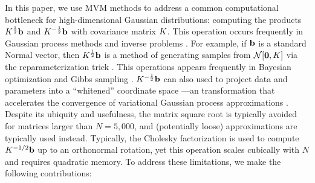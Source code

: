 In this paper, we use MVM methods to address a common computational bottleneck for high-dimensional Gaussian distributions: computing the products $K^{\frac 1 2} \mathbf{b}$ and $K^{-\frac 1 2} \mathbf{b}$ with covariance matrix $K$.
This operation occurs frequently in Gaussian process methods and inverse problems .
For example, if $\mathbf{b}$ is a standard Normal vector, then $K^{\frac 1 2} \mathbf{b}$ is a method of generating samples from $\normaldist{\bzero}{\bK}$ via the reparameterization trick \cite{kingma2013auto}.
This operations appears frequently in Bayesian optimization  and Gibbs sampling .
$K^{-\frac 1 2} \mathbf{b}$ can also used to project data and parameters into a ``whitened'' coordinate space ---an transformation that accelerates the convergence of variational Gaussian process approximations \cite{hensman2013gaussian,matthews2017scalable}.
Despite its ubiquity and usefulness, the matrix square root is typically avoided for matrices larger than $N=5,\!000$, and (potentially loose) approximations are typically used instead.
Typically, the Cholesky factorization is used to compute $K^{-1/2} \mathbf{b}$ up to an orthonormal rotation, yet this operation scales cubically with $N$ and requires quadratic memory.
To address these limitations, we make the following contributions:
%
